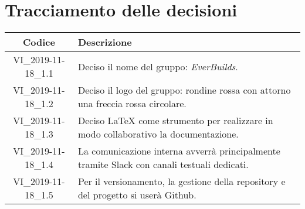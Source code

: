 \section*{Tracciamento delle decisioni}

\begin{center}
	\begin{longtable}{|c|p{12.25cm}|}
	\hline
	\rowcolor{lighter-grayer}
	\textbf{Codice} & \textbf{Descrizione} \\
	\hline
	\endfirsthead

	\hline
	VI\_2019-11-18\_1.1 & Deciso il nome del gruppo: \textit{EverBuilds}. \\
	\hline
	VI\_2019-11-18\_1.2 & Deciso il logo del gruppo: rondine rossa con attorno una freccia rossa circolare. \\
	\hline
	VI\_2019-11-18\_1.3 & Deciso \LaTeX{} come strumento per realizzare in modo collaborativo la documentazione. \\
	\hline
	VI\_2019-11-18\_1.4 & La comunicazione interna avverrà principalmente tramite Slack con canali testuali dedicati. \\
	\hline
	VI\_2019-11-18\_1.5 & Per il versionamento, la gestione della repository e del progetto si userà Github. \\
	\hline

	\end{longtable}
\end{center}
